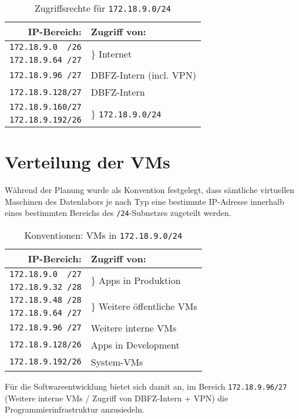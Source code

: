\begin{table}[h!]
  \centering
  \caption{Zugriffsrechte für \texttt{172.18.9.0/24}}
  \begin{tabular}{rl}

    \toprule
    IP-Bereich: & Zugriff von: \\
    \midrule
    \texttt{172.18.9.0\ \ /26}    & \multirow{2}{*}{$\Biggr \}$ Internet}\\
    \texttt{172.18.9.64\ /27}   & \\
    \texttt{172.18.9.96\ /27}   & DBFZ-Intern (incl. VPN) \\
    \texttt{172.18.9.128/27}  & DBFZ-Intern  \\
    \texttt{172.18.9.160/27}    & \multirow{2}{*}{$\Biggr \}$ \texttt{172.18.9.0/24}}\\
    \texttt{172.18.9.192/26}   & \\
    \bottomrule
  \end{tabular}
    
\end{table}

\section{Verteilung der VMs} \label{ipbereich}
Während der Planung wurde als Konvention festgelegt, dass sämtliche virtuellen Maschinen des Datenlabors je nach Typ eine bestimmte IP-Adresse innerhalb eines bestimmten Bereichs des \texttt{/24}-Subnetzes zugeteilt werden.

\begin{table}[h!]
  \centering
  \caption{Konventionen: VMs in \texttt{172.18.9.0/24}}
  \begin{tabular}{rl}

    \toprule
    IP-Bereich: & Zugriff von: \\
    \midrule
    \texttt{172.18.9.0\ \ /27}    & \multirow{2}{*}{$\Biggr \}$ Apps in Produktion}\\
    \texttt{172.18.9.32\ /28}   & \\
    \texttt{172.18.9.48\ /28}   & \multirow{2}{*}{$\Biggr \}$ Weitere öffentliche VMs}\\
    \texttt{172.18.9.64\ /27}  &  \\
    \texttt{172.18.9.96\ /27}  &  Weitere interne VMs \\
    \texttt{172.18.9.128/26}  &  Apps in Development \\
    \texttt{172.18.9.192/26}  & System-VMs \\
    \bottomrule
  \end{tabular}
    
\end{table}

Für die Softwareentwicklung bietet sich damit an, im Bereich \texttt{172.18.9.96/27} (Weitere interne VMs / Zugriff von DBFZ-Intern + VPN) die Programmierinfrastruktur anzusiedeln.